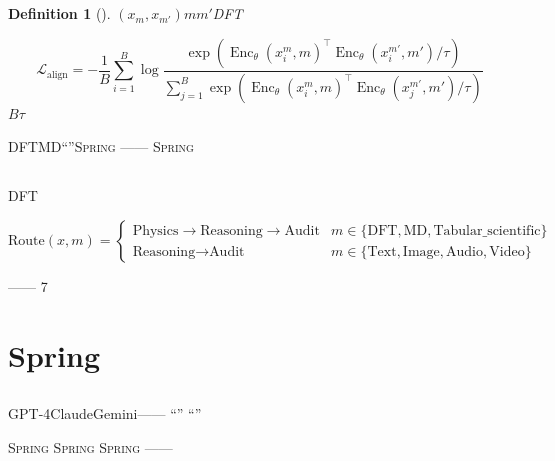 \documentclass[12pt,a4paper]{article}
\newtheorem{definition}[theorem]{Definition}
\theoremstyle{remark}
\newcommand{\loss}{\mathcal{L}}
\newcommand{\Spring}{\textsc{Spring}}
\DeclareMathOperator{\Enc}{Enc}
\begin{document}
\subsection{}



\begin{definition}[]\label{def:contrastive}
$(x_m, x_{m'})$$m$$m'$DFT

\begin{equation}\label{eq:contrastive_loss}
    \loss_{\text{align}} = -\frac{1}{B}\sum_{i=1}^{B} \log\frac{
        \exp(\Enc_\theta(x_i^m, m)^\top \Enc_\theta(x_i^{m'}, m') / \tau)
    }{
        \sum_{j=1}^{B} \exp(\Enc_\theta(x_i^m, m)^\top \Enc_\theta(x_j^{m'}, m') / \tau)
    }
\end{equation}
$B$$\tau$
\end{definition}

DFTMD“”\Spring{}
——
\textit{}\Spring{}

\subsection{}

DFT
\textbf{}

\begin{equation}\label{eq:router}
    \text{Route}(x, m) = \begin{cases}
        \text{Physics} \to \text{Reasoning} \to \text{Audit} & m \in \{\text{DFT}, \text{MD}, \text{Tabular\_scientific}\} \\
        \text{Reasoning} \to \text{Audit} & m \in \{\text{Text}, \text{Image}, \text{Audio}, \text{Video}\}
    \end{cases}
\end{equation}

\textbf{}——
7

\newpage

\section{Spring}

\subsection{}

GPT-4ClaudeGemini——
“”
“”\textbf{}

\Spring{}\textbf{}
\Spring{}
\Spring{}
——
\end{document}
